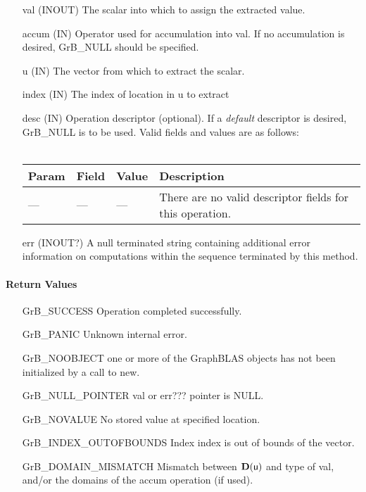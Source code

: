 \begin{itemize}[leftmargin=1in]
    \item[{\sf val}]   ({\sf INOUT}) The scalar into which to assign the extracted value.
    \item[{\sf accum}] ({\sf IN}) Operator used for accumulation into {\sf val}. If no accumulation is desired,
                        {\sf GrB\_NULL} should be specified.
    \item[{\sf u}]     ({\sf IN})  The vector from which to extract the scalar.
    \item[{\sf index}] ({\sf IN}) The index of location in {\sf u} to extract

    \item[{\sf desc}]  ({\sf IN}) Operation descriptor (optional). If a
    \emph{default} descriptor is desired, {\sf GrB\_NULL} is to be
    used.  Valid fields and values are as follows: \\ ~ \\
    \begin{tabular}{lllp{2.5in}}
    Param & Field  & Value & Description \\
    \hline
    {\sf ---} & {\sf ---} & {\sf ---} & There are no valid descriptor fields for this operation. \\
    \end{tabular}
    \item[{\sf err}]   ({\sf INOUT?})  A null terminated string containing additional error
                         information on computations within the sequence 
                         terminated by this method. 

\end{itemize}

\paragraph{Return Values}

\begin{itemize}[leftmargin=2.1in]
\item[{\sf GrB\_SUCCESS}]          Operation completed successfully.
\item[{\sf GrB\_PANIC}]            Unknown internal error.
\item[{\sf GrB\_NOOBJECT}]   one or more of the GraphBLAS objects has
                             not been initialized by a call to {\sf new}.
\item[{\sf GrB\_NULL\_POINTER}]    {\sf val} or {\sf err???} pointer is {\sf NULL}.
\item[{\sf GrB\_NOVALUE}]        No stored value at specified location.
\item[{\sf GrB\_INDEX\_OUTOFBOUNDS}]  Index {\sf index} is out of 
                                      bounds of the vector. 
\item[{\sf GrB\_DOMAIN\_MISMATCH}]    Mismatch between $\bold{D}(\sf u)$ and type of {\sf val},
                                      and/or the domains of the 
                                      {\sf accum} operation (if used).
\end{itemize}

